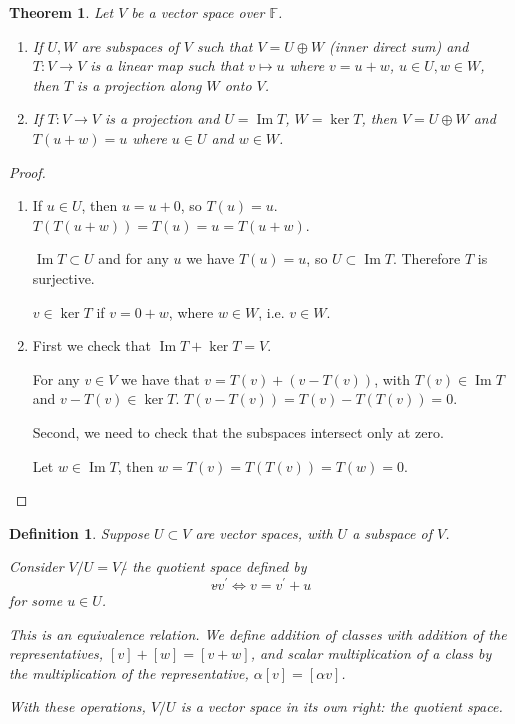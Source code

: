 \documentclass{article}
\newtheorem{definition}{Definition}
\newtheorem{theorem}{Theorem}
\DeclareMathOperator{\im}{Im}
\newcommand{\F}{\mathbb{F}}
\begin{document}
\begin{theorem}
    Let $V$ be a vector space over $\F$.

    \begin{enumerate}
        \item If $U, W$ are subspaces of $V$ such that $V = U \oplus W$ (inner
            direct sum) and $T : V \to V$ is a linear map such that $v \mapsto
            u$ where $v = u + w$, $u \in U, w \in W$, then $T$ is a projection
            along $W$ onto $V$.

        \item If $T : V \to V$ is a projection and $U = \im{T}$, $W = \ker{T}$,
            then $V = U \oplus W$ and $T(u+w) = u$ where $u \in U$ and $w \in
            W$.
    \end{enumerate}
\end{theorem}

\begin{proof}
    \begin{enumerate}
        \item If $u \in U$, then $u = u + 0$, so $T(u) = u$. $T(T(u + w)) =
            T(u) = u = T(u + w)$.

            $\im{T} \subset U$ and for any $u$ we have $T(u) = u$, so $U
            \subset \im{T}$. Therefore $T$ is surjective.

            $v \in \ker{T}$ if $v = 0 + w$, where $w \in W$, i.e. $v \in W$.

        \item First we check that $\im{T} + \ker{T} = V$.

            For any $v \in V$ we have that $v = T(v) + (v - T(v))$, with $T(v)
            \in \im{T}$ and $v - T(v) \in \ker{T}$. $T(v - T(v)) = T(v) -
            T(T(v)) = 0$.

            Second, we need to check that the subspaces intersect only at zero.

            Let $w \in \im{T}$, then $w = T(v) = T(T(v)) = T(w) = 0$.
    \end{enumerate}
\end{proof}

\begin{definition}
    Suppose $U \subset V$ are vector spaces, with $U$ a subspace of $V$.

    Consider $V/U = V/\tilde{}$ the \emph{quotient space} defined by
    $$
        v \tilde{} v^\prime \iff v = v^\prime + u
    $$
    for some $u \in U$.

    This is an equivalence relation. We define addition of classes with
    addition of the representatives, $[v] + [w] = [v + w]$, and scalar
    multiplication of a class by the multiplication of the representative,
    $\alpha [v] = [\alpha v]$.

    With these operations, $V/U$ is a vector space in its own right: the
    \emph{quotient space}.
\end{definition}
\end{document}

